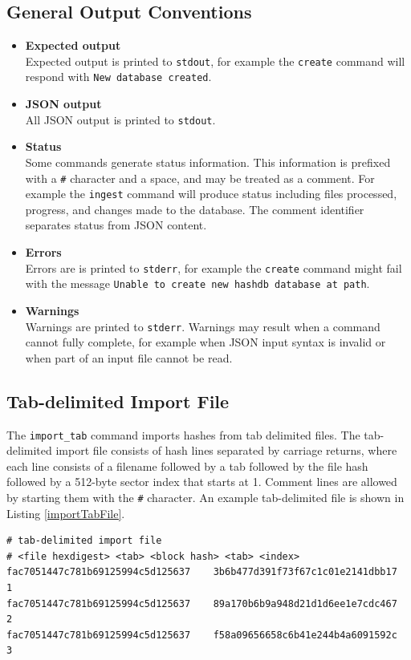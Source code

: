 \documentclass[11pt,fleqn]{article} %
\begin{document}
\subsection{General Output Conventions}

\begin{itemize}
\item \textbf{Expected output}\\
Expected output is printed to \verb+stdout+, for example the \hdb \verb+create+ command will respond with \verb+New database created+.
\item \textbf{JSON output}\\
All JSON output is printed to \verb+stdout+.
\item \textbf{Status}\\
Some commands generate status information. This information is prefixed with a \verb+#+ character and a space, and may be treated as a comment. For example the \hdb \verb+ingest+ command will produce status including files processed, progress, and changes made to the database. The comment identifier separates status from JSON content.
\item \textbf{Errors}\\
Errors are is printed to \verb+stderr+, for example the \hdb \verb+create+ command might fail with the message \verb+Unable to create new hashdb database at path+.
\item \textbf{Warnings}\\
Warnings are printed to \verb+stderr+. Warnings may result when a command cannot fully complete, for example when JSON input syntax is invalid or when part of an input file cannot be read.
\end{itemize}

\subsection{Tab-delimited Import File}
\label{TabFile}
The \verb+import_tab+ command imports hashes from tab delimited files.
The tab-delimited import file consists of hash lines separated by carriage returns, where each line consists of a filename followed by a tab followed by the file hash followed by a 512-byte sector index that starts at 1.  Comment lines are allowed by starting them with the \texttt{\#} character.
An example tab-delimited file is shown in Listing \ref{importTabFile}.\\

\lstset{style=customfile}
\begin{lstlisting}[float, caption={Example tab-delimited import file}, label=importTabFile]
# tab-delimited import file
# <file hexdigest> <tab> <block hash> <tab> <index>
fac7051447c781b69125994c5d125637    3b6b477d391f73f67c1c01e2141dbb17    1
fac7051447c781b69125994c5d125637    89a170b6b9a948d21d1d6ee1e7cdc467    2
fac7051447c781b69125994c5d125637    f58a09656658c6b41e244b4a6091592c    3
\end{lstlisting}
\end{document}

